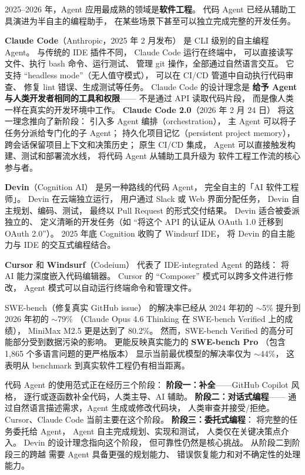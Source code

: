 2025--2026 年，Agent 应用最成熟的领域是\textbf{软件工程}。
代码 Agent 已经从辅助工具演进为半自主的编程助手，
在某些场景下甚至可以独立完成完整的开发任务。

\textbf{Claude Code}（Anthropic，2025 年 2 月发布）
是 CLI 级别的自主编程 Agent。
与传统的 IDE 插件不同，
Claude Code 运行在终端中，
可以直接读写文件、执行 bash 命令、运行测试、
管理 git 操作，全部通过自然语言交互。
它支持 “headless mode”（无人值守模式），
可以在 CI/CD 管道中自动执行代码审查、
修复 lint 错误、生成测试等任务。
Claude Code 的设计理念是
\textbf{给予 Agent 与人类开发者相同的工具和权限}——
不是通过 API 读取代码片段，
而是像人类一样在真实的开发环境中工作。
\textbf{Claude Code 2.0}（2026 年 2 月 24 日）
将这一理念推向了新阶段：
引入多 Agent 编排（orchestration），
主 Agent 可以将子任务分派给专门化的子 Agent；
持久化项目记忆（persistent project memory），
跨会话保留项目上下文和决策历史；
原生 CI/CD 集成，
Agent 可以直接触发构建、测试和部署流水线，
将代码 Agent 从辅助工具升级为
软件工程工作流的核心参与者。

\textbf{Devin}（Cognition AI）
是另一种路线的代码 Agent，
完全自主的「AI 软件工程师」。
Devin 在云端独立运行，
用户通过 Slack 或 Web 界面分配任务，
Devin 自主规划、编码、测试，
最终以 Pull Request 的形式交付结果。
Devin 适合被委派独立的、
定义清晰的开发任务（如 “将这个 API 的认证从 OAuth 1.0 迁移到 OAuth 2.0”）。
2025 年底 Cognition 收购了 Windsurf IDE，
将 Devin 的自主能力与 IDE 的交互式编程结合。

\textbf{Cursor} 和 \textbf{Windsurf}（Codeium）
代表了 IDE-integrated Agent 的路线：
将 AI 能力深度嵌入代码编辑器。
Cursor 的 “Composer” 模式可以跨多文件进行修改，
Agent 模式可以自动运行终端命令和管理文件。

SWE-bench（修复真实 GitHub issue）
的解决率已经从 2024 年初的 $\sim$5\%
提升到 2026 年初的 $\sim$79\%
（Claude Opus 4.6 Thinking 在 SWE-bench Verified 上的成绩），
MiniMax M2.5 更是达到了 80.2\%。
然而，SWE-bench Verified 的高分可能部分受到数据污染的影响。
更能反映真实能力的 \textbf{SWE-bench Pro}
（包含 1,865 个多语言问题的更严格版本）
显示当前最优模型的解决率仅为 $\sim$44\%，
这表明从 benchmark 到真实软件工程仍有相当距离。

\begin{corebox}
代码 Agent 的使用范式正在经历三个阶段：
\textbf{阶段一：补全}——GitHub Copilot 风格，
逐行或逐函数补全代码，人类主导、AI 辅助。
\textbf{阶段二：对话式编程}——
通过自然语言描述需求，Agent 生成或修改代码块，
人类审查并接受/拒绝。Cursor、Claude Code 当前主要在这个阶段。
\textbf{阶段三：委托式编程}：
将完整的任务委托给 Agent，
Agent 自主完成规划、实现和测试，
人类仅在关键决策点介入。
Devin 的设计理念指向这个阶段，
但可靠性仍然是核心挑战。
从阶段二到阶段三的跨越
需要 Agent 具备更强的规划能力、
错误恢复能力和对不确定性的处理能力。
\end{corebox}

